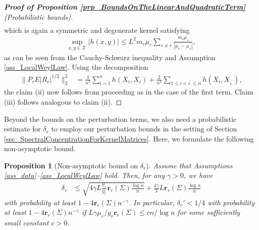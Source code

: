 \documentclass[a4paper,11pt]{article} %
\numberwithin{equation}{section}
\theoremstyle{definition}
\theoremstyle{remark}
\theoremstyle{plain}
\newtheorem{proposition}[definition]{Proposition}
\begin{document}
\begin{proof}[\normalfont \textbf{Proof of Proposition \ref{prp_BoundsOnTheLinearAndQuadraticTerm}} (Probabilistic bounds)]
\begin{align}
  \end{align}
  which is again a symmetric and degenerate kernel satisfying
  \begin{align}
      \sup_{x,y\in\mathcal{X}}|h(x,y)|\leq  L^2m_r\mu_r\sum_{s\neq r}\frac{m_s\mu_s}{|\mu_r-\mu_s|},
  \end{align}
  as can be seen from the Cauchy-Schwarz inequality and Assumption \ref{ass_LocalWeylLaw}. Using the decomposition
  \begin{align}
      \| P_{r} E | R_{r} |^{1/2} \|_{2}^2&=\frac{1}{n^2}\sum_{i=1}^n h(X_i,X_i)+\frac{2}{n^2}\sum_{1\leq i<i^\prime\leq n} h(X_i,X_{i^\prime}),
  \end{align}
  the claim (ii) now follows from proceeding as in the case of the first term. Claim (iii) follows analogous to claim (ii).
\end{proof}

Beyond the bounds on the perturbation terms, we also need a probabilistic estimate for \( \delta_{r} \) to employ our perturbation bounds in the setting of Section \ref{sec_SpectralConcentrationForKernelMatrices}.
Here, we formulate the following non-asymptotic bound.

\begin{proposition}[Non-asymptotic bound on \( \delta_{r} \)]%
  \label{prp_NonAsymptoticBoundOnDelta_r}
  Assume that Assumptions \ref{ass_data}--\ref{ass_LocalWeylLaw} hold. Then, for any \(\gamma > 0 \), we have
  \begin{align}
          \delta_{r} 
    & \le 
          \sqrt{4 \gamma L \frac{\mu_{r}}{g_{r}} \mathbf{r}_r(\Sigma) \frac{\log n}{n} } 
        + 
          \frac{ 4\gamma }{ 3 } L \mathbf{r}_{r}( \Sigma ) \frac{ \log n }{n}
  \end{align}
  with probability at least \( 1 - 4 \mathbf{r}_{r}( \Sigma ) n^{- \gamma} \).
  In particular, \( \delta_{r}' < 1 / 4 \) with probability at least \( 1 - 4 \mathbf{r}_{r}( \Sigma ) n^{- \gamma} \) if \( L \gamma \mu_{r} / g_{r}  \mathbf{r}_r(\Sigma) \le c n / \log n \) for some sufficiently small constant $c > 0$.
\end{proposition}%
\end{document}
